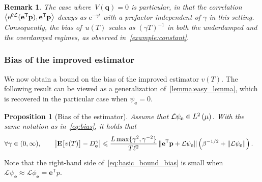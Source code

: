 \documentclass[11pt,a4paper]{article}
\newcommand{\e}{\mathrm{e}}
\newcommand{\expect}[0]{\mathbf{E}}
\newcommand{\vect}[1]{\boldsymbol{\mathbf #1}}
\renewcommand{\t}{\mathsf T}
\theoremstyle{plain}
\newtheorem{proposition}[theorem]{Proposition}
\newtheorem{remark}{Remark}[section]
\numberwithin{equation}{section}
\renewcommand{\leq}{\leqslant}
\begin{document}
\begin{remark}
The case where~$V(\vect q) = 0$ is particular,
in that the correlation $\ip{\e^{\theta \mathcal L} (\vect e^\t \vect p)}{\vect e^\t \vect p}$ decays as $\e^{-\gamma t}$ with a prefactor independent of $\gamma$ in this setting.
Consequently, the bias of~$u(T)$ scales as $(\gamma T)^{-1}$ in both the underdamped and the overdamped regimes,
as observed in~\cref{example:constant}.
\end{remark}

\subsubsection{Bias of the improved estimator}%
\label{ssub:bias_of_the_improved_estimator}
We now obtain a bound on the bias of the improved estimator $v(T)$.
The following result can be viewed as a generalization of~\cref{lemma:easy_lemma},
which is recovered in the particular case when $\psi_{\vect e} = 0$.
\begin{proposition}
    [Bias of the estimator]
    \label{lemma:bias_improved}
    Assume that $\mathcal L \psi_{\vect e} \in \lp{2}{\mu}$.
    With the same notation as in~\eqref{eq:bias},
    it holds that
    \begin{align}
        \label{eq:basic_bound_bias}
        \forall \gamma \in (0, \infty), \qquad
        \abs{\expect \bigl[ v(T) \bigr] - D^{\gamma}_{\vect e}}
                &\leq  \frac{L \max\{\gamma^2, \gamma^{-2}\}}{T \ell^2 }  \,  \norm*{\vect e^\t \vect p + \mathcal L \psi_{\vect e}}  \left(\beta^{-1/2} + \norm{\mathcal L \psi_{\vect e}} \right).
    \end{align}
\end{proposition}
Note that the right-hand side of~\eqref{eq:basic_bound_bias} is small when $\mathcal L \psi_{\vect e} \approx \mathcal L \phi_{\vect e} = \vect e^\t p$.
\end{document}
